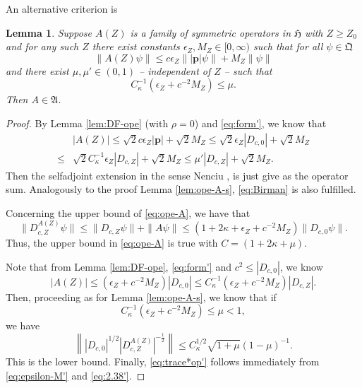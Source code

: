 \documentclass[a4paper]{amsart}
\newtheorem{lemma}{Lemma}
\def\bp{{\mathbf p}}
\def\gA{\mathfrak{A}}
\def\gH{\mathfrak{H}}
\def\gQ{\mathfrak{Q}}
\begin{document}
An alternative criterion is 
\begin{lemma}\label{lem:ope-A-s'}
  Suppose $A(Z)$ is a family of symmetric operators in $\gH$ with $Z\geq Z_0$ and for any such $Z$ there exist constants
  $\epsilon_Z, M_Z\in [0,\infty)$ such that for all $\psi\in \gQ$
  \begin{equation}
    \label{eq:form'}
   \|A(Z)\psi\| \leq c\epsilon_{Z} \||\bp|\psi\| + M_{Z}\|\psi\|
  \end{equation}
  and there exist $\mu,\mu'\in(0,1)$ -- independent of $Z$ -- such that
  \begin{equation}
    \label{eq:epsilon-M'}
  C_\kappa^{-1}( \epsilon_{Z} +c^{-2}M_{Z}) \leq \mu.
  \end{equation}
   Then $A\in \gA$.
\end{lemma}
\begin{proof}
By  Lemma \ref{lem:DF-ope} (with $\rho=0$) and \eqref{eq:form'}, we know that
\begin{equation}
  \begin{split}
    &|A(Z)|\leq \sqrt{2}c\epsilon_Z |\bp|+ \sqrt{2}M_Z
    \leq \sqrt{2}\epsilon_Z|D_{c,0}|+ \sqrt{2}M_Z\\
    \leq &\sqrt{2} C_\kappa^{-1}\epsilon_Z |D_{c,Z}|+\sqrt{2}M_Z\leq \mu' |D_{c,Z}|+\sqrt{2}M_Z.
  \end{split}
\end{equation}
Then the selfadjoint extension in the sense Nenciu \cite{Nenciu1976},
is just give as the operator sum. Analogously to the proof Lemma
\ref{lem:ope-A-s}, \eqref{eq:Birman} is also fulfilled.

Concerning the upper bound of \eqref{eq:ope-A}, we have that
\begin{equation}
    \|D_{c,Z}^{A(Z)} \psi\|\leq \|D_{c,Z}\psi\|+\|A\psi\|\leq \left(1+2\kappa+\epsilon_{Z}+c^{-2}M_{Z}\right)\|D_{c,0}\psi\|.
\end{equation}
Thus, the upper bound in \eqref{eq:ope-A} is true with
  $C=(1+2\kappa+\mu).$

Note that from Lemma \ref{lem:DF-ope}, \eqref{eq:form'} and $c^2\leq |D_{c,0}|$, we know 
\begin{equation}\label{eq:2.38'}
    |A(Z)| \leq (\epsilon_Z+c^{-2}M_Z)|D_{c,0}|\leq C_\kappa^{-1}(\epsilon_Z+c^{-2}M_Z)|D_{c,Z}|.
\end{equation}
Then, proceeding as for Lemma \ref{lem:ope-A-s}, we know that if 
\begin{equation}
    C_\kappa^{-1}(\epsilon_Z+c^{-2}M_Z)\leq \mu<1,
\end{equation}
we have
\begin{equation}
    \left\||D_{c,0}|^{1/2}|D_{c,Z}^{A(Z)}|^{-\frac12}\right\|\leq C_\kappa^{1/2}\sqrt{1+\mu}(1-\mu)^{-1}.
\end{equation}
This is the lower bound. Finally, \eqref{eq:trace*op'} follows
immediately from \eqref{eq:epsilon-M'} and \eqref{eq:2.38'}.
\end{proof}
\end{document}
